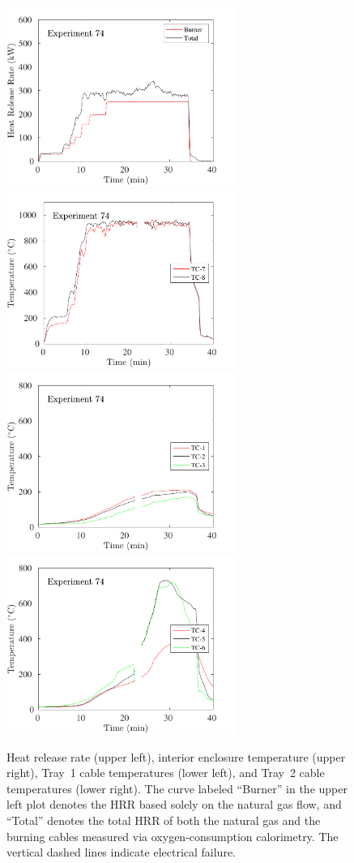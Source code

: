 \begin{figure}[H]
\includegraphics[height=2.30in]{../SCRIPT_FIGURES/Test_74_HRR} \hfill
\includegraphics[height=2.30in]{../SCRIPT_FIGURES/Test_74_TC_7-8} \\
\includegraphics[height=2.30in]{../SCRIPT_FIGURES/Test_74_TC_1-3} \hfill
\includegraphics[height=2.30in]{../SCRIPT_FIGURES/Test_74_TC_4-6}
\caption[HRR and temperatures of Exp.~74]{Heat release rate (upper left), interior enclosure temperature (upper right), Tray~1 cable temperatures (lower left), and Tray~2 cable temperatures (lower right). The curve labeled ``Burner'' in the upper left plot denotes the HRR based solely on the natural gas flow, and ``Total'' denotes the total HRR of both the natural gas and the burning cables measured via oxygen-consumption calorimetry. The vertical dashed lines indicate electrical failure.}
\label{fig:Test_74}
\end{figure}

